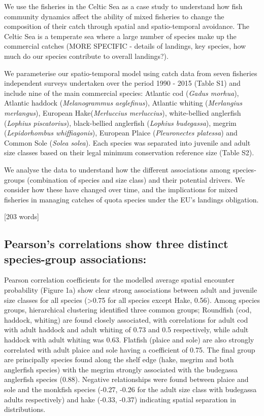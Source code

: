 \documentclass{nature}
\begin{document}
\begin{linenumbers}
We use the fisheries in the Celtic Sea as a case study to understand how fish
community dynamics affect the ability of mixed fisheries to change the
composition of their catch through spatial and spatio-temporal avoidance. The
Celtic Sea is a temperate sea where a large number of species make up the
commercial catches (MORE SPECIFIC - details of landings, key species, how much
do our species contribute to overall landings?).

We parameterise our spatio-temporal model using catch data from seven fisheries
independent surveys undertaken over the period 1990 - 2015 (Table S1) and
include nine of the main commercial species: Atlantic cod (\textit{Gadus
	morhua}), Atlantic haddock (\textit{Melanogrammus aeglefinus}),
Atlantic whiting (\textit{Merlangius merlangus}), European
Hake(\textit{Merluccius merluccius}), white-bellied anglerfish (\textit{Lophius
	piscatorius}), black-bellied anglerfish (\textit{Lophius budegassa}),
megrim (\textit{Lepidorhombus whiffiagonis}), European Plaice
(\textit{Pleuronectes platessa}) and Common Sole (\textit{Solea solea}).  Each
species was separated into juvenile and adult size classes based on their legal
minimum conservation reference size (Table S2).

We analyse the data to understand how the different associations among
species-groups (combination of species and size class) and their potential
drivers. We consider how these have changed over time, and the implications for
mixed fisheries in managing catches of quota species under the EU's landings
obligation.

[203 words]

\subsection{Pearson's correlations show three distinct species-group
	associations:} Pearson correlation coefficients for the modelled
average spatial encounter probability (Figure 1a) show clear strong
associations between adult and juvenile size classes for all species
(\textgreater 0.75 for all species except Hake, 0.56).  Among species groups,
hierarchical clustering identified three common groups; Roundfish (cod,
haddock, whiting) are found closely associated, with correlations for adult cod
with adult haddock and adult whiting of 0.73 and 0.5 respectively, while adult
haddock with adult whiting was 0.63. Flatfish (plaice and sole) are also
strongly correlated with adult plaice and sole having a coefficient of 0.75.
The final group are principally species found along the shelf edge (hake,
megrim and both anglerfish species) with the megrim strongly associated with
the budegassa anglerfish species (0.88). Negative relationships were found
between plaice and sole and the monkfish species (-0.27, -0.26 for the adult
size class with budegassa adults respectively) and hake (-0.33, -0.37)
indicating spatial separation in distributions.


\end{linenumbers}
\end{document}
